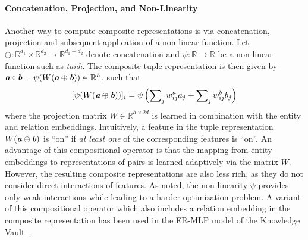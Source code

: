 \documentclass[letterpaper]{article}
\renewcommand{\vec}[1]{\textit{\textbf{#1}}}
\newcommand{\va}{\vec{a}}
\newcommand{\vb}{\vec{b}}
\newcommand{\comp}{\circ}
\newcommand{\concat}{\oplus}
\newcommand{\hole}{\textsc{HolE}\xspace}
\newcommand{\rescal}{\textsc{Rescal}\xspace}
\newcommand{\R}{\mathbb{R}}
\begin{document}
\begin{figure*}[tb]
{\begin{minipage}{0.33\textwidth}
{
      }
      \vspace{-1ex}
    \end{minipage}
  }
  \caption{\rescal and \hole as neural networks. \rescal represents
    pairs of entities via $d^2$ components (middle layer). In contrast, \hole
    requires only $d$ components.\label{fig:nn}}
\end{figure*}

\paragraph{Concatenation, Projection, and Non-Linearity}
Another way to compute composite representations is via concatenation,
projection and subsequent application of a non-linear function. 
Let $\concat : \R^{d_1} \times \R^{d_2} \to \R^{d_1 + d_2}$
denote concatenation and $\psi : \R \to \R$ be a non-linear function
such as \emph{tanh}. The composite tuple representation is then
given by $\va \comp \vb = \psi(W (\va \concat \vb)) \in \R^h$, such that
\begin{equation}
  \label{eq:concat}
  [\psi(W (\va \concat \vb))]_i = \psi\left(\sum\nolimits_j w_{ij}^a a_j + \sum\nolimits_j w_{ij}^b b_j\right)
\end{equation}
where the projection matrix $W \in \R^{h \times 2d}$ is learned in
combination with the entity and relation embeddings. Intuitively, a feature in
the tuple representation $W(\va \concat \vb)$ is ``on'' if \emph{at least one}
of the corresponding features is ``on''. An advantage of this
compositional operator is that the mapping from entity embeddings to
representations of pairs is learned adaptively via the matrix $W$. 
However, the resulting composite representations
are also less rich, as they do not consider direct interactions of
features. As \citet{socher2013reasoning} noted, the non-linearity
$\psi$ provides only weak interactions while leading to a harder optimization problem.
A variant of this compositional operator which also includes a relation
embedding in the composite representation has been used in
the ER-MLP model of the Knowledge Vault~\citep{dong2014knowledge}.
\end{document}

